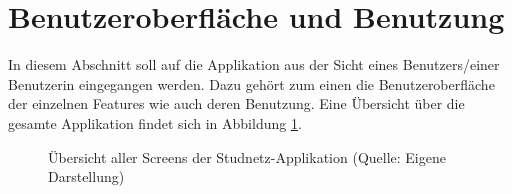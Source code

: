 \documentclass[../main.tex]{subfiles}
\begin{document}
\section{Benutzeroberfläche und Benutzung}%
In diesem Abschnitt soll auf die Applikation aus der Sicht eines Benutzers/einer Benutzerin eingegangen werden. Dazu gehört zum einen die Benutzeroberfläche der einzelnen Features wie auch deren Benutzung. Eine Übersicht über die gesamte Applikation findet sich in Abbildung \ref{overview}.
\begin{figure} 
	\centering
	\caption{Übersicht aller Screens der Studnetz-Applikation (Quelle: Eigene Darstellung)}
	\label{overview}
\end{figure}
\end{document}
